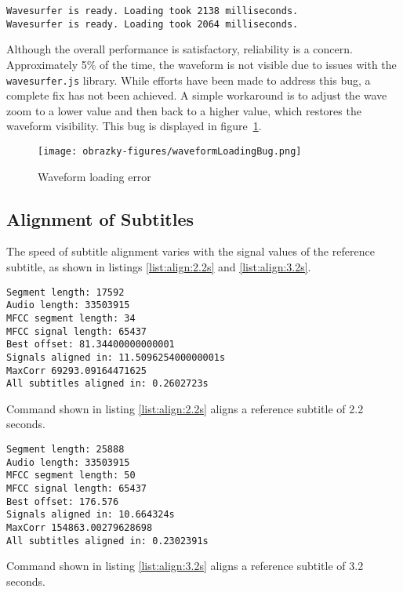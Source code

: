 \begin{clisting}
\label{list:wavesurfer:ready}
\begin{verbatim}
Wavesurfer is ready. Loading took 2138 milliseconds.
Wavesurfer is ready. Loading took 2064 milliseconds.
\end{verbatim}
\end{clisting}

Although the overall performance is satisfactory, reliability is a concern. Approximately 5\% of the time, the waveform is not visible due to issues with the \texttt{wavesurfer.js} library. While efforts have been made to address this bug, a complete fix has not been achieved. A simple workaround is to adjust the wave zoom to a lower value and then back to a higher value, which restores the waveform visibility.
This bug is displayed in figure~\ref{fig:waveform:loading:bug}.

\begin{figure}[ht]
    \centering
    \texttt{[image: obrazky-figures/waveformLoadingBug.png]}
    \caption{Waveform loading error}
    \label{fig:waveform:loading:bug}
\end{figure}

\subsection{Alignment of Subtitles}
The speed of subtitle alignment varies with the signal values of the reference subtitle, as shown in listings \ref{list:align:2.2s} and \ref{list:align:3.2s}.

\begin{clisting}
\label{list:align:2.2s}
\begin{verbatim}
Segment length: 17592
Audio length: 33503915
MFCC segment length: 34
MFCC signal length: 65437
Best offset: 81.34400000000001
Signals aligned in: 11.509625400000001s
MaxCorr 69293.09164471625
All subtitles aligned in: 0.2602723s
\end{verbatim}
\end{clisting}
\noindent Command shown in listing \ref{list:align:2.2s} aligns a reference subtitle of 2.2 seconds.

\begin{clisting}
\label{list:align:3.2s}
\begin{verbatim}
Segment length: 25888
Audio length: 33503915
MFCC segment length: 50
MFCC signal length: 65437
Best offset: 176.576
Signals aligned in: 10.664324s
MaxCorr 154863.00279628698
All subtitles aligned in: 0.2302391s
\end{verbatim}
\end{clisting}
\noindent Command shown in listing \ref{list:align:3.2s} aligns a reference subtitle of 3.2 seconds.

